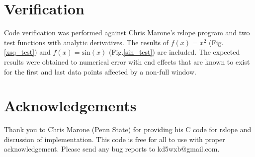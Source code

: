 \documentclass[a4paper,11pt,oneside]{article}
\begin{document}
\section{Verification}

Code verification was performed against Chris Marone's rslope program and two test functions with analytic derivatives.  The results of $f(x) = x^2$ (Fig.\ref{xsq_test}) and $f(x) = \text{sin}(x)$ (Fig.\ref{sin_test}) are included.  The expected results were obtained to numerical error with end effects that are known to exist for the first and last data points affected by a non-full window.

\noindent%
\begin{minipage}{\linewidth}
\label{xsq_test}
\end{minipage}


\noindent%
\begin{minipage}{\linewidth}
 \label{sin_test}
\end{minipage}



\section{Acknowledgements}
Thank you to Chris Marone (Penn State) for providing his C code for rslope and discussion of implementation.  This code is free for all to use with proper acknowledgement.  Please send any bug reports to kd5wxb@gmail.com.
\end{document}
